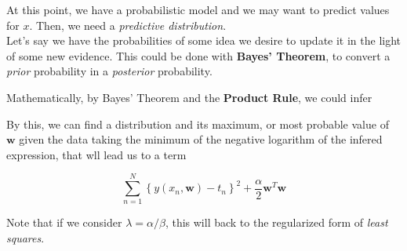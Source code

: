 \begin{frame}{\insertsubsection}

At this point, we have a probabilistic model and we may want to predict values for $x$. Then, we need a \textit{predictive distribution}. \\
\vspace{1em}
Let's say we have the probabilities of some idea we desire to update it in the light of some new evidence. This could be done with \textbf{Bayes' Theorem}, to convert a \textit{prior} probability in a \textit{posterior} probability. \\
\end{frame}

\begin{frame}{\insertsubsection}
Mathematically, by Bayes' Theorem and the \textbf{Product Rule}, we could infer
\end{frame}

\begin{frame}{\insertsubsection}
By this, we can find a distribution and its maximum, or most probable value of $\mathbf{w}$ given the data taking the minimum of the negative logarithm of the infered expression, that wll lead us to a term

\begin{equation*}
\sum^N_{n=1} \left\{ y(x_n, \mathbf{w}) - t_n \right\}^2 + \frac{\alpha}{2} \mathbf{w}^T\mathbf{w}
\end{equation*}

Note that if we consider $\lambda = \alpha / \beta$, this will back to the regularized form of \textit{least squares}.
\end{frame}

